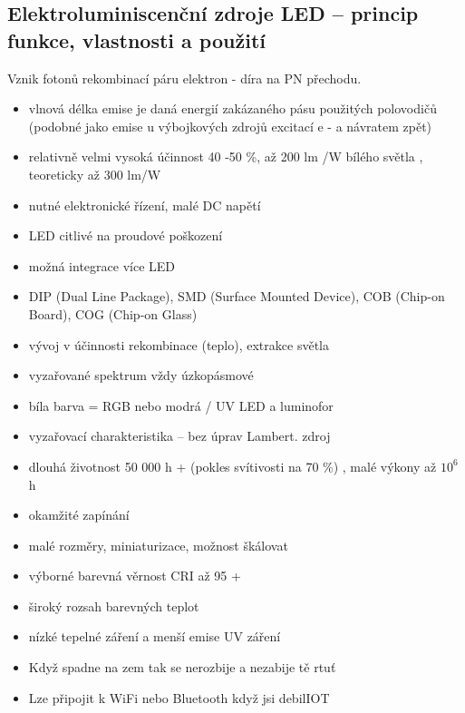 \documentclass[a4paper, 12pt]{article}
\begin{document}
        \subsection{Elektroluminiscenční zdroje LED – princip funkce, vlastnosti a použití}
            Vznik fotonů rekombinací páru elektron - díra na PN přechodu.
            \begin{itemize}
                \item vlnová délka emise je daná energií zakázaného pásu použitých polovodičů (podobné jako emise u výbojkových zdrojů excitací e - a návratem zpět)
                \item relativně velmi vysoká účinnost 40 -50 \%, až 200 lm /W bílého světla , teoreticky až 300 lm/W
                \item nutné elektronické řízení, malé DC napětí
                \item LED citlivé na proudové poškození
                \item možná integrace více LED
                \item DIP (Dual Line Package), SMD (Surface Mounted Device), COB (Chip-on Board), COG (Chip-on Glass)
                \item vývoj v účinnosti rekombinace (teplo), extrakce světla
                \item vyzařované spektrum vždy úzkopásmové
                \item bíla barva = RGB nebo modrá / UV LED a luminofor
                \item vyzařovací charakteristika – bez úprav Lambert. zdroj
                \item dlouhá životnost 50 000 h + (pokles svítivosti na 70 \%) , malé výkony až $10^6$ h
                \item okamžité zapínání
                \item malé rozměry, miniaturizace, možnost škálovat
                \item výborné barevná věrnost CRI až 95 +
                \item široký rozsah barevných teplot
                \item nízké tepelné záření a menší emise UV záření
                \item Když spadne na zem tak se nerozbije a nezabije tě rtuť
                \item Lze připojit k WiFi nebo Bluetooth když jsi debilIOT
            \end{itemize}
\end{document}
